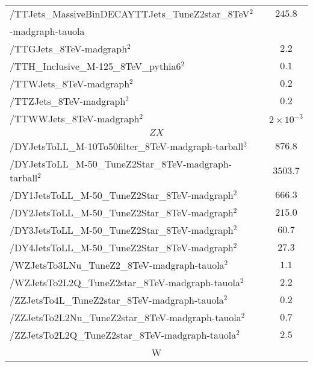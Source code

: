 \begin{table}[!ht]
\begin{center}
{\begin{tabular}{|l|c|}
/TTJets\_MassiveBinDECAYTTJets\_TuneZ2star\_8TeV$^{2}$  &  $245.8$       \\
-madgraph-tauola                                        &               \\
/TTGJets\_8TeV-madgraph$^{2}$                                  &  $2.2$              \\%
/TTH\_Inclusive\_M-125\_8TeV\_pythia6$^{2}$                    &  $0.1$               \\
/TTWJets\_8TeV-madgraph$^{2}$                                  &  $0.2$              \\
/TTZJets\_8TeV-madgraph$^{2}$                                  &  $0.2$                \\
/TTWWJets\_8TeV-madgraph$^{2}$                                 &  $2\times 10^{-3}$                \\

\hline
\multicolumn{2}{|c|}{$ZX$ }\\
\hline
/DYJetsToLL\_M-10To50filter\_8TeV-madgraph-tarball$^{2}$      &   $876.8$               \\
/DYJetsToLL\_M-50\_TuneZ2Star\_8TeV-madgraph-tarball$^{2}$    &   $3503.7$               \\
/DY1JetsToLL\_M-50\_TuneZ2Star\_8TeV-madgraph$^{2}$           &   $666.3$               \\
/DY2JetsToLL\_M-50\_TuneZ2Star\_8TeV-madgraph$^{2}$           &   $215.0$               \\
/DY3JetsToLL\_M-50\_TuneZ2Star\_8TeV-madgraph$^{2}$           &   $60.7$               \\
/DY4JetsToLL\_M-50\_TuneZ2Star\_8TeV-madgraph$^{2}$           &   $27.3$               \\
/WZJetsTo3LNu\_TuneZ2\_8TeV-madgraph-tauola$^{2}$             &  $1.1$                \\
/WZJetsTo2L2Q\_TuneZ2star\_8TeV-madgraph-tauola$^{2}$         &  $2.2$                \\
/ZZJetsTo4L\_TuneZ2star\_8TeV-madgraph-tauola$^{2}$           &  $0.2$                \\
/ZZJetsTo2L2Nu\_TuneZ2star\_8TeV-madgraph-tauola$^{2}$        &  $0.7$                \\
/ZZJetsTo2L2Q\_TuneZ2star\_8TeV-madgraph-tauola$^{2}$         &  $2.5$                \\
\hline
\multicolumn{2}{|c|}{W}\\
\hline


\end{tabular}}
\end{center}
\end{table}
